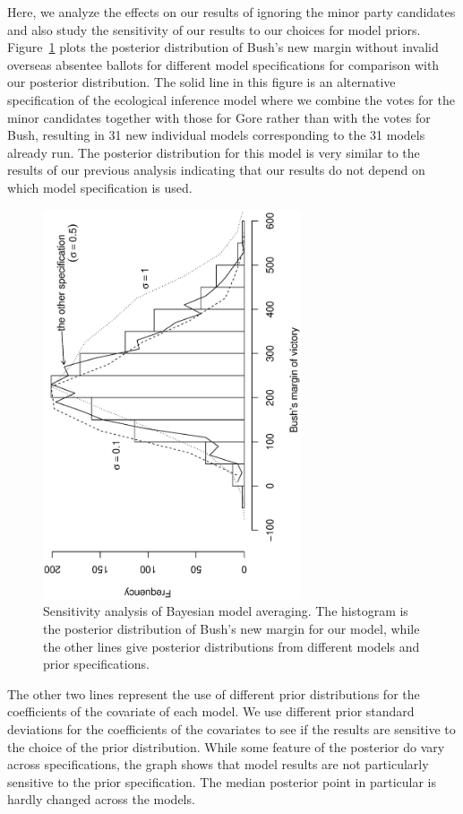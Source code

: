\documentclass[11pt,titlepage]{article}
\begin{document}
Here, we analyze the effects on our results of ignoring the minor
party candidates and also study the sensitivity of our results to our
choices for model priors.  Figure~\ref{fg:sensitivity} plots the
posterior distribution of Bush's new margin without invalid overseas
absentee ballots for different model specifications for comparison
with our posterior distribution.  The solid line in this figure is an
alternative specification of the ecological inference model where we
combine the votes for the minor candidates together with those for
Gore rather than with the votes for Bush, resulting in 31 new
individual models corresponding to the 31 models already run.  The
posterior distribution for this model is very similar to the results
of our previous analysis indicating that our results do not depend on
which model specification is used.
\begin{figure}[t]
\begin{center}
\includegraphics[width=3in,angle=-90]{sensitivity}
\caption{Sensitivity analysis of Bayesian model
  averaging. The histogram is the posterior distribution of Bush's new
  margin for our model, while the other lines give posterior
  distributions from different models and prior specifications.}
\label{fg:sensitivity}
\end{center} 
\end{figure}
The other two lines represent the use of different prior distributions
for the coefficients of the covariate of each model.  We use different
prior standard deviations for the coefficients of the covariates to
see if the results are sensitive to the choice of the prior
distribution.  While some feature of the posterior do vary across
specifications, the graph shows that model results are not
particularly sensitive to the prior specification.  The median
posterior point in particular is hardly changed across the models.

\singlespacing

%

\end{document}
